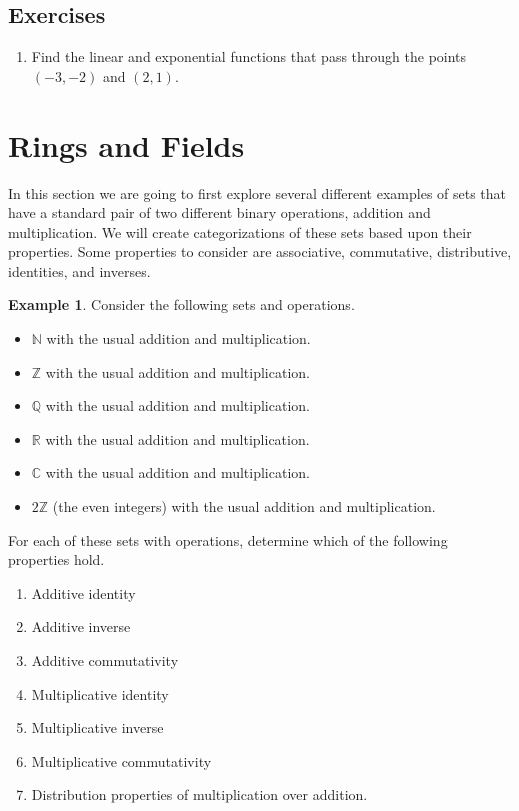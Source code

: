 \documentclass[
]{book}
\providecommand{\tightlist}{%
  \setlength{\itemsep}{0pt}\setlength{\parskip}{0pt}}
\theoremstyle{definition}
\theoremstyle{definition}
\newtheorem{example}{Example}[chapter]
\theoremstyle{definition}
\theoremstyle{remark}
\begin{document}
\hypertarget{exercises-21}{%
\subsection{Exercises}\label{exercises-21}}

\begin{enumerate}
\def\labelenumi{\arabic{enumi}.}
\tightlist
\item
  Find the linear and exponential functions that pass through the points \((-3,-2)\) and \((2,1)\).
\end{enumerate}

\hypertarget{sec:Exploration}{%
\section{Rings and Fields}\label{sec:Exploration}}

In this section we are going to first explore several different examples of sets that have a standard pair of two different binary operations, addition and multiplication. We will create categorizations of these sets based upon their properties. Some properties to consider are associative, commutative, distributive, identities, and inverses.

\begin{example}
\protect\hypertarget{exm:rings}{}{\label{exm:rings} }Consider the following sets and operations.

\begin{itemize}
\item
  \(\mathbb{N}\) with the usual addition and multiplication.
\item
  \(\mathbb{Z}\) with the usual addition and multiplication.
\item
  \(\mathbb{Q}\) with the usual addition and multiplication.
\item
  \(\mathbb{R}\) with the usual addition and multiplication.
\item
  \(\mathbb{C}\) with the usual addition and multiplication.
\item
  \(2\mathbb{Z}\) (the even integers) with the usual addition and multiplication.
\end{itemize}

For each of these sets with operations, determine which of the following properties hold.

\begin{enumerate}
\def\labelenumi{\arabic{enumi}.}
\item
  Additive identity
\item
  Additive inverse
\item
  Additive commutativity
\item
  Multiplicative identity
\item
  Multiplicative inverse
\item
  Multiplicative commutativity
\item
  Distribution properties of multiplication over addition.
\end{enumerate}
\end{example}
\end{document}

